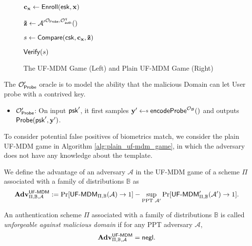 \begin{figure}[h]
\begin{minipage}[t]{0.45\linewidth}
\begin{algorithm}[H]
\begin{algorithmic}[1]
		\State $\mathbf{c_x} \gets {\sf Enroll}({\sf esk}, \mathbf{x})$

		\State ${\mathbf{\tilde{z}}} \gets \mathcal{A'}^{\mathcal{O}_{\sf Probe}, \mathcal{O}_{\sf auth}^q}()$

		\State $s \gets {\sf Compare}( {\sf csk}, \mathbf{c_x}, \mathbf{\tilde{z}} )$

		\State \Return ${\sf Verify}(s)$
	\end{algorithmic}
	\end{algorithm}
	\end{minipage}

\caption{The \textsf{UF-MDM} Game (Left) and Plain \textsf{UF-MDM} Game (Right)}
\label{fig:uf-mdm_game}
\end{figure}

The $\mathcal{O}_{\sf Probe}^\prime$ oracle is to model the ability that the malicious {\sf Domain} can let {\sf User} probe with a contrived key.

\begin{itemize}

	\item $\mathcal{O}_{\sf Probe}^\prime$: On input ${\sf psk}^\prime$, it first samples $\mathbf{y}^\prime \getsdollar {\sf encodeProbe}^{\mathcal{O}_{\mathcal{B}}}()$ and outputs ${\sf Probe}({\sf psk}^\prime, \mathbf{y}^\prime)$.

\end{itemize}

To consider potential false positives of biometrics match, we consider the plain \textsf{UF-MDM} game in Algorithm \ref{alg:plain_uf-mdm_game}, in which the adversary does not have any knowledge about the template.

We define the advantage of an adversary $\mathcal{A}$ in the \textsf{UF-MDM} game of a scheme $\Pi$ associated with a family of distributions $\mathbb{B}$ as
\[
	\mathbf{Adv}^{\textsf{UF-MDM}}_{\Pi, \mathbb{B}, \mathcal{A}} := \Pr[{\textsf{UF-MDM}}_{\Pi, \mathbb{B}}(\mathcal{A}) \to 1] -
	\sup_{\text{PPT } \mathcal{A'}} \Pr[\textsf{UF-MDM}^\prime_{\Pi, \mathbb{B}}(\mathcal{A'}) \to 1].
\]

An authentication scheme $\Pi$ associated with a family of distributions $\mathbb{B}$ is called \emph{unforgeable against malicious domain} if for any PPT adversary $\mathcal{A}$,
\[
	\mathbf{Adv}^{\textsf{UF-MDM}}_{\Pi, \mathbb{B}, \mathcal{A}} = \mathsf{negl}.
\]

% 

\nocite{*}
\printbibliography



